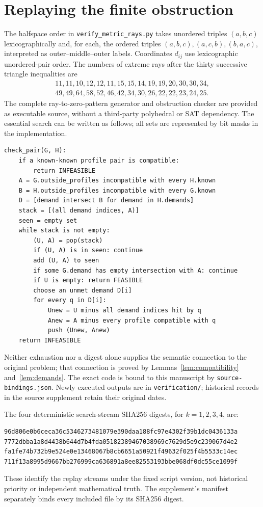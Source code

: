 \documentclass[11pt]{article}
\theoremstyle{definition}
\theoremstyle{remark}
\begin{document}
\appendix
\section{Replaying the finite obstruction}\label{app:certificate}

The halfspace order in \texttt{verify\_metric\_rays.py} takes unordered
triples $(a,b,c)$ lexicographically and, for each, the ordered triples
$(a,b,c),(a,c,b),(b,a,c)$, interpreted as outer--middle--outer labels.
Coordinates $d_{ij}$ use lexicographic unordered-pair order. The numbers of
extreme rays after the thirty successive triangle inequalities are
\[
\begin{gathered}
11,11,10,12,12,11,15,15,14,19,19,20,30,30,34,\\
49,49,64,58,52,46,42,34,30,26,22,22,23,24,25.
\end{gathered}
\]
The complete ray-to-zero-pattern generator and obstruction checker are
provided as executable source, without a third-party polyhedral or SAT
dependency. The essential search can be written as follows; all sets are
represented by bit masks in the implementation.

\begin{lstlisting}
check_pair(G, H):
    if a known-known profile pair is compatible:
        return INFEASIBLE
    A = G.outside_profiles incompatible with every H.known
    B = H.outside_profiles incompatible with every G.known
    D = [demand intersect B for demand in H.demands]
    stack = [(all demand indices, A)]
    seen = empty set
    while stack is not empty:
        (U, A) = pop(stack)
        if (U, A) is in seen: continue
        add (U, A) to seen
        if some G.demand has empty intersection with A: continue
        if U is empty: return FEASIBLE
        choose an unmet demand D[i]
        for every q in D[i]:
            Unew = U minus all demand indices hit by q
            Anew = A minus every profile compatible with q
            push (Unew, Anew)
    return INFEASIBLE
\end{lstlisting}

Neither exhaustion nor a digest alone supplies the semantic connection to
the original problem; that connection is proved by
Lemmas~\ref{lem:compatibility} and~\ref{lem:demands}. The exact code is
bound to this manuscript by \texttt{source-bindings.json}. Newly executed
outputs are in \texttt{verification/}; historical records in the source
supplement retain their original dates.

The four deterministic search-stream SHA256 digests, for $k=1,2,3,4$, are:
\begin{lstlisting}[basicstyle=\ttfamily\footnotesize]
96d806e0b6ceca36c5346273481079e390daa188fc97e4302f39b1dc0436133a
7772dbba1a8d4438b644d7b4fda05182389467038969c7629d5e9c239067d4e2
fa1fe74b732b9e524e0e13468067b8cb6651a50921f49632f025f4b5533c14ec
711f13a8995d9667bb276999ca636891a8ee82553193bbe068df0dc55ce1099f
\end{lstlisting}
These identify the replay streams under the fixed script version, not
historical priority or independent mathematical truth. The supplement's
manifest separately binds every included file by its SHA256 digest.
\end{document}
